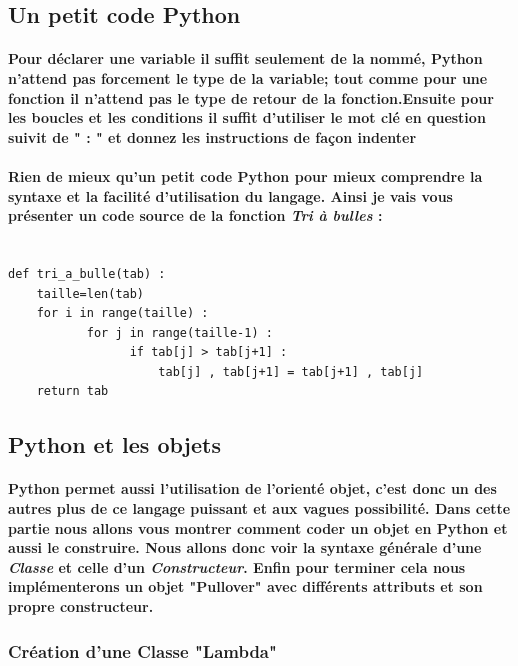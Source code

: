 \documentclass[a4paper, 12pt, twoside]{article}
\begin{document}
\subsection{Un petit code Python}

\paragraph{Pour déclarer une variable il suffit seulement de la nommé, Python n'attend pas forcement le type de la variable; tout comme pour une fonction il n'attend pas le type de retour de la fonction.Ensuite pour les boucles et les conditions il suffit d'utiliser le mot clé en question suivit de " : " et donnez les instructions de façon indenter}

\paragraph{Rien de mieux qu'un petit code Python pour mieux comprendre la syntaxe et la facilité d'utilisation du langage. Ainsi je vais vous présenter un code source de la fonction \textit{Tri à bulles} :}

\begin{verbatim}

def tri_a_bulle(tab) :
    taille=len(tab)
    for i in range(taille) :
           for j in range(taille-1) : 
                 if tab[j] > tab[j+1] :
                     tab[j] , tab[j+1] = tab[j+1] , tab[j]
    return tab
\end{verbatim}

\subsection{Python et les objets}
\paragraph{Python permet aussi l'utilisation de l'orienté objet, c'est donc un des autres plus de ce langage puissant et aux vagues possibilité. Dans cette partie nous allons vous montrer comment coder un objet en Python et aussi le construire. Nous allons donc voir la syntaxe générale d'une  \textit{Classe} et celle d'un \textit{Constructeur}. Enfin pour terminer cela nous implémenterons un objet "Pullover" avec différents attributs et son propre constructeur.}

\subsubsection{Création d'une Classe "Lambda" }
\end{document}
